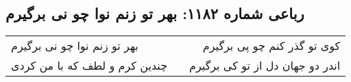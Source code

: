 \begin{center}
\section*{رباعی شماره ۱۱۸۲: بهر تو زنم نوا چو نی برگیرم}
\label{sec:1182}
\begin{longtable}{l p{0.5cm} r}
بهر تو زنم نوا چو نی برگیرم
&&
کوی تو گذر کنم چو پی برگیرم
\\
چندین کرم و لطف که با من کردی
&&
اندر دو جهان دل از تو کی برگیرم
\\
\end{longtable}
\end{center}

